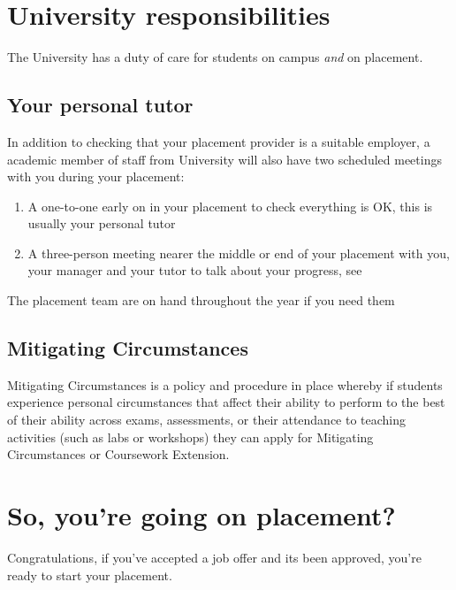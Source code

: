 \documentclass[
]{book}
\providecommand{\tightlist}{%
  \setlength{\itemsep}{0pt}\setlength{\parskip}{0pt}}
\begin{document}
\chapter{University responsibilities}\label{university}

The University has a duty of care for students on campus \emph{and} on placement.

\section{Your personal tutor}\label{tutor}

In addition to checking that your placement provider is a suitable employer, a academic member of staff from University will also have two scheduled meetings with you during your placement:

\begin{enumerate}
\def\labelenumi{\arabic{enumi}.}
\tightlist
\item
  A one-to-one early on in your placement to check everything is OK, this is usually your personal tutor
\item
  A three-person meeting nearer the middle or end of your placement with you, your manager and your tutor to talk about your progress, see
\end{enumerate}

The placement team are on hand throughout the year if you need them

\section{Mitigating Circumstances}\label{mitcircs}

Mitigating Circumstances is a policy and procedure in place whereby if students experience personal circumstances that affect their ability to perform to the best of their ability across exams, assessments, or their attendance to teaching activities (such as labs or workshops) they can apply for Mitigating Circumstances or Coursework Extension. \citep{mitcircs}

\chapter{So, you're going on placement?}\label{starting}

Congratulations, if you've accepted a job offer and its been approved, you're ready to start your placement.
\end{document}
